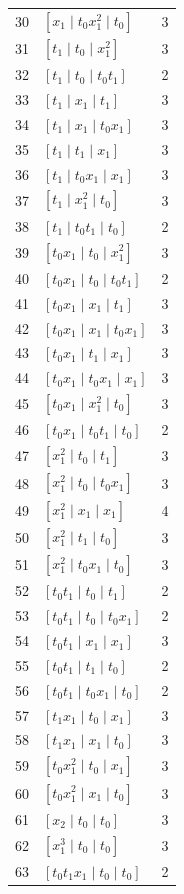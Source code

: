 \begin{longtable}{r l r}
30 & $[x_1\mid t_0 x_1^{2}\mid t_0]$ & 3\\
31 & $[t_1\mid t_0\mid x_1^{2}]$ & 3\\
32 & $[t_1\mid t_0\mid t_0 t_1]$ & 2\\
33 & $[t_1\mid x_1\mid t_1]$ & 3\\
34 & $[t_1\mid x_1\mid t_0 x_1]$ & 3\\
35 & $[t_1\mid t_1\mid x_1]$ & 3\\
36 & $[t_1\mid t_0 x_1\mid x_1]$ & 3\\
37 & $[t_1\mid x_1^{2}\mid t_0]$ & 3\\
38 & $[t_1\mid t_0 t_1\mid t_0]$ & 2\\
39 & $[t_0 x_1\mid t_0\mid x_1^{2}]$ & 3\\
40 & $[t_0 x_1\mid t_0\mid t_0 t_1]$ & 2\\
41 & $[t_0 x_1\mid x_1\mid t_1]$ & 3\\
42 & $[t_0 x_1\mid x_1\mid t_0 x_1]$ & 3\\
43 & $[t_0 x_1\mid t_1\mid x_1]$ & 3\\
44 & $[t_0 x_1\mid t_0 x_1\mid x_1]$ & 3\\
45 & $[t_0 x_1\mid x_1^{2}\mid t_0]$ & 3\\
46 & $[t_0 x_1\mid t_0 t_1\mid t_0]$ & 2\\
47 & $[x_1^{2}\mid t_0\mid t_1]$ & 3\\
48 & $[x_1^{2}\mid t_0\mid t_0 x_1]$ & 3\\
49 & $[x_1^{2}\mid x_1\mid x_1]$ & 4\\
50 & $[x_1^{2}\mid t_1\mid t_0]$ & 3\\
51 & $[x_1^{2}\mid t_0 x_1\mid t_0]$ & 3\\
52 & $[t_0 t_1\mid t_0\mid t_1]$ & 2\\
53 & $[t_0 t_1\mid t_0\mid t_0 x_1]$ & 2\\
54 & $[t_0 t_1\mid x_1\mid x_1]$ & 3\\
55 & $[t_0 t_1\mid t_1\mid t_0]$ & 2\\
56 & $[t_0 t_1\mid t_0 x_1\mid t_0]$ & 2\\
57 & $[t_1 x_1\mid t_0\mid x_1]$ & 3\\
58 & $[t_1 x_1\mid x_1\mid t_0]$ & 3\\
59 & $[t_0 x_1^{2}\mid t_0\mid x_1]$ & 3\\
60 & $[t_0 x_1^{2}\mid x_1\mid t_0]$ & 3\\
61 & $[x_2\mid t_0\mid t_0]$ & 3\\
62 & $[x_1^{3}\mid t_0\mid t_0]$ & 3\\
63 & $[t_0 t_1 x_1\mid t_0\mid t_0]$ & 2\\
\end{longtable}
